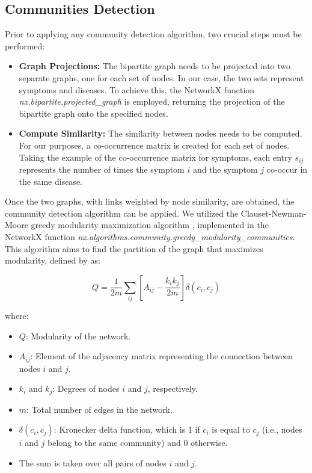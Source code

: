 \subsection{Communities Detection}
Prior to applying any community detection algorithm, two crucial steps must be performed:


\begin{itemize}
    \setlength\itemsep{1em} %
    \item \textbf{Graph Projections:} The bipartite graph needs to be projected into two separate graphs, 
    one for each set of nodes. In our case, the two sets represent symptoms and diseases. To achieve this, 
    the NetworkX function \textit{nx.bipartite.projected\_graph} is employed, returning the projection of 
    the bipartite graph onto the specified nodes.
    
    \item \textbf{Compute Similarity:} The similarity between nodes needs to be computed. For our purposes, 
    a co-occurrence matrix is created for each set of nodes. Taking the example of the co-occurrence matrix 
    for symptoms, each entry \(s_{ij}\) represents the number of times the symptom \(i\) and the symptom \(j\) 
    co-occur in the same disease.
\end{itemize}

Once the two graphs, with links weighted by node similarity, are obtained, the community detection algorithm 
can be applied. We utilized the Clauset-Newman-Moore greedy modularity maximization algorithm \cite{Clauset_Newman_Moore_2004}, 
implemented in the NetworkX function \textit{nx.algorithms.community.greedy\_modularity\_communities}. This algorithm aims to 
find the partition of the graph that maximizes modularity, defined by  \cite{Newman_2006} as:

\begin{equation}
    Q = \frac{1}{2m} \sum_{ij} \left[A_{ij} - \frac{k_i k_j}{2m}\right] \delta(c_i, c_j) \label{eq:modularity}
\end{equation}

where:

\begin{itemize}
    \setlength\itemsep{0.4em} %
    \item \(Q\): Modularity of the network.
    \item \(A_{ij}\): Element of the adjacency matrix representing the connection between nodes \(i\) and \(j\).
    \item \(k_i\) and \(k_j\): Degrees of nodes \(i\) and \(j\), respectively.
    \item \(m\): Total number of edges in the network.
    \item \(\delta(c_i, c_j)\): Kronecker delta function, which is 1 if \(c_i\) is equal to \(c_j\) (i.e., nodes \(i\) 
    and \(j\) belong to the same community) and 0 otherwise.
    \item The sum is taken over all pairs of nodes \(i\) and \(j\).
\end{itemize}






